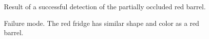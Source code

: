 \documentclass[letterpaper, 10 pt, conference]{ieeeconf}  %
\begin{document}
   \begin{figure}[thpb]
      \centering
      
      \caption{Result of a successful detection of the partially occluded red barrel.}
      \label{resulttest1}
   \end{figure}

   \begin{figure}[thpb]
      \centering
      
      \caption{Failure mode. The red fridge has similar shape and color as a red barrel.}
      \label{resulttest2}
   \end{figure}
   
\end{document}
